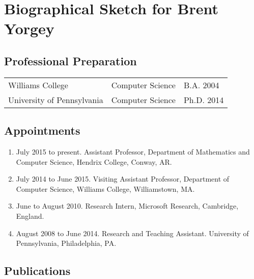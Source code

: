 \section*{Biographical Sketch for Brent Yorgey}

\subsection*{Professional Preparation}


\begin{tabular}{lll}
Williams College           & Computer Science   & B.A. 2004  \\
University of Pennsylvania & Computer Science   & Ph.D. 2014 \\
\end{tabular}

\subsection*{Appointments}

\begin{enumerate}\itemsep 0pt
\item July 2015 to present.  Assistant Professor, Department of
  Mathematics and Computer Science, Hendrix College, Conway, AR.

\item July 2014 to June 2015. Visiting Assistant Professor, Department of
  Computer Science, Williams College, Williamstown, MA.

\item June to August 2010.  Research Intern, Microsoft Research,
  Cambridge, England.

\item August 2008 to June 2014. Research and
  Teaching Assistant. University of Pennsylvania, Philadelphia, PA.
\end{enumerate}


\subsection*{Publications}

